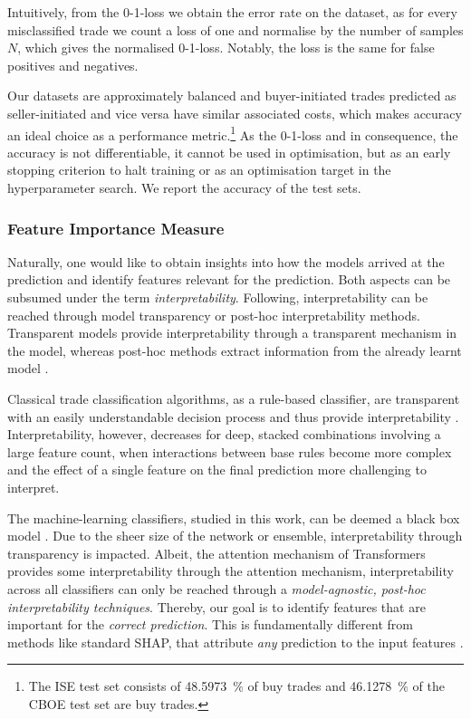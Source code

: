 Intuitively, from the 0-1-loss we obtain the error rate on the dataset, as for every misclassified trade we count a loss of one and normalise by the number of samples $N$, which gives the normalised 0-1-loss. Notably, the loss is the same for false positives and negatives.

Our datasets are approximately balanced and buyer-initiated trades predicted as seller-initiated and vice versa have similar associated costs, which makes accuracy an ideal choice as a performance metric.\footnote{The \gls{ISE} test set consists of \SI{48.5973}{\percent} of buy trades and \SI{46.1278}{\percent} of the \gls{CBOE} test set are buy trades.} As the 0-1-loss and in consequence, the accuracy is not differentiable, it cannot be used in optimisation, but as an early stopping criterion to halt training or as an optimisation target in the hyperparameter search. We report the accuracy of the test sets.

\subsubsection{Feature Importance
    Measure}\label{sec:feature-importance-measure}

Naturally, one would like to obtain insights into how the models arrived at the prediction and identify features relevant for the prediction. Both aspects can be subsumed under the term \emph{interpretability}. Following, \textcite[][4]{liptonMythosModelInterpretability2017} interpretability can be reached through model transparency or post-hoc interpretability methods. Transparent models provide interpretability through a transparent mechanism in the model, whereas post-hoc methods extract information from the already learnt model \autocite[][4--5]{liptonMythosModelInterpretability2017}.

Classical trade classification algorithms, as a rule-based classifier, are transparent with an easily understandable decision process and thus provide interpretability \autocite[][91]{barredoarrietaExplainableArtificialIntelligence2020}. Interpretability, however, decreases for deep, stacked combinations involving a large feature count, when interactions between base rules become more complex and the effect of a single feature on the final prediction more challenging to interpret.

The machine-learning classifiers, studied in this work, can be deemed a black box model \autocite[][90]{barredoarrietaExplainableArtificialIntelligence2020}. Due to the sheer size of the network or ensemble, interpretability through transparency is impacted. Albeit, the attention mechanism of Transformers provides some interpretability through the attention mechanism,  interpretability across all classifiers can only be reached through a \emph{model-agnostic, post-hoc interpretability techniques}. Thereby, our goal is to identify features that are important for the \emph{correct prediction}. This is fundamentally different from methods like standard \gls{SHAP}, that attribute \emph{any} prediction to the input features \autocite[][??]{chenTrueModelTrue2020}.

